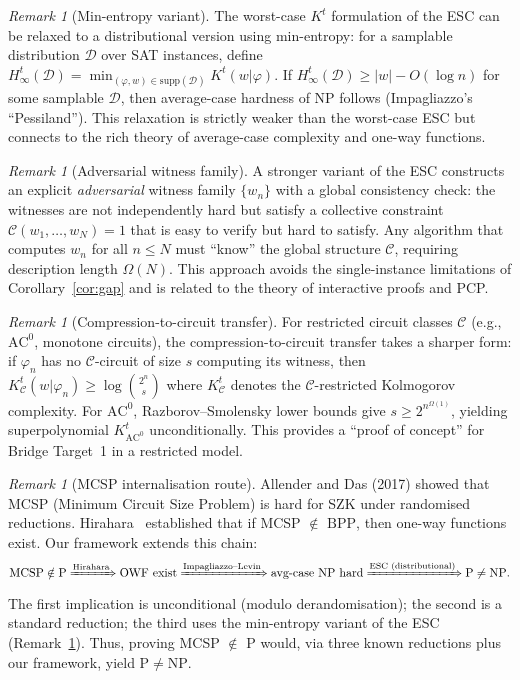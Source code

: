 \documentclass[aps,prd,twocolumn,superscriptaddress,nofootinbib]{revtex4-2}
\theoremstyle{definition}
\theoremstyle{remark}
\newtheorem{remark}[theorem]{Remark}
\newcommand{\NP}{\mathrm{NP}}
\newcommand{\PP}{\mathrm{P}}
\newcommand{\BPP}{\mathrm{BPP}}
\begin{document}
\begin{remark}[Min-entropy variant]
\label{rem:min-entropy}
The worst-case $K^t$ formulation of the ESC can be relaxed to a distributional version using min-entropy: for a samplable distribution $\mathcal{D}$ over SAT instances, define $H_\infty^t(\mathcal{D}) = \min_{(\varphi, w) \in \mathrm{supp}(\mathcal{D})} K^t(w | \varphi)$. If $H_\infty^t(\mathcal{D}) \geq |w| - O(\log n)$ for some samplable $\mathcal{D}$, then average-case hardness of NP follows (Impagliazzo's ``Pessiland''). This relaxation is strictly weaker than the worst-case ESC but connects to the rich theory of average-case complexity and one-way functions.
\end{remark}

\begin{remark}[Adversarial witness family]
\label{rem:adversarial-witness}
A stronger variant of the ESC constructs an explicit \emph{adversarial} witness family $\{w_n\}$ with a global consistency check: the witnesses are not independently hard but satisfy a collective constraint $\mathcal{C}(w_1, \ldots, w_N) = 1$ that is easy to verify but hard to satisfy. Any algorithm that computes $w_n$ for all $n \leq N$ must ``know'' the global structure $\mathcal{C}$, requiring description length $\Omega(N)$. This approach avoids the single-instance limitations of Corollary~\ref{cor:gap} and is related to the theory of interactive proofs and PCP.
\end{remark}

\begin{remark}[Compression-to-circuit transfer]
\label{rem:compression-circuit}
For restricted circuit classes $\mathcal{C}$ (e.g., $\mathrm{AC}^0$, monotone circuits), the compression-to-circuit transfer takes a sharper form: if $\varphi_n$ has no $\mathcal{C}$-circuit of size $s$ computing its witness, then $K^t_{\mathcal{C}}(w | \varphi_n) \geq \log \binom{2^n}{s}$ where $K^t_{\mathcal{C}}$ denotes the $\mathcal{C}$-restricted Kolmogorov complexity. For $\mathrm{AC}^0$, Razborov--Smolensky lower bounds give $s \geq 2^{n^{\Omega(1)}}$, yielding superpolynomial $K^t_{\mathrm{AC}^0}$ unconditionally. This provides a ``proof of concept'' for Bridge Target~1 in a restricted model.
\end{remark}

\begin{remark}[MCSP internalisation route]
\label{rem:mcsp-internalisation}
Allender and Das (2017) showed that MCSP (Minimum Circuit Size Problem) is hard for SZK under randomised reductions. Hirahara~\cite{Hirahara2018} established that if MCSP $\notin$ $\BPP$, then one-way functions exist. Our framework extends this chain:
\[
\text{MCSP} \notin \text{P} \xRightarrow{\text{Hirahara}} \text{OWF exist} \xRightarrow{\text{Impagliazzo--Levin}} \text{avg-case NP hard} \xRightarrow{\text{ESC (distributional)}} \text{P} \neq \text{NP}.
\]
The first implication is unconditional (modulo derandomisation); the second is a standard reduction; the third uses the min-entropy variant of the ESC (Remark~\ref{rem:min-entropy}). Thus, proving MCSP $\notin$ $\PP$ would, via three known reductions plus our framework, yield $\PP \neq \NP$.
\end{remark}
\end{document}
